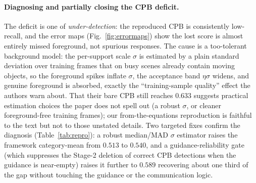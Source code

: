 \documentclass[sn-basic]{sn-jnl}
\begin{document}
\paragraph{Diagnosing and partially closing the CPB deficit.}
The deficit is one of \emph{under-detection}: the reproduced CPB is consistently
low-recall, and the error maps (Fig.~\ref{fig:errormaps}) show the lost score is almost
entirely missed foreground, not spurious responses. The cause is a too-tolerant
background model: the per-support scale $\sigma$ is estimated by a plain standard
deviation over training frames that on busy scenes already contain moving objects, so the
foreground spikes inflate $\sigma$, the acceptance band $\eta\sigma$ widens, and genuine
foreground is absorbed, exactly the ``training-sample quality'' effect the authors
warn about. That their bare CPB still reaches $0.633$ suggests practical estimation
choices the paper does not spell out (a robust $\sigma$, or cleaner foreground-free
training frames); our from-the-equations reproduction is faithful to the text but not to
those unstated details. Two targeted fixes confirm the diagnosis (Table~\ref{tab:repro}):
a robust median/MAD $\sigma$ estimator raises the framework category-mean from $0.513$ to
$0.540$, and a guidance-reliability gate (which suppresses the Stage-2 deletion of correct
CPB detections when the guidance is near-empty) raises it further to $0.589$ 
recovering about one third of the gap without touching the guidance or the communication
logic.
\end{document}
